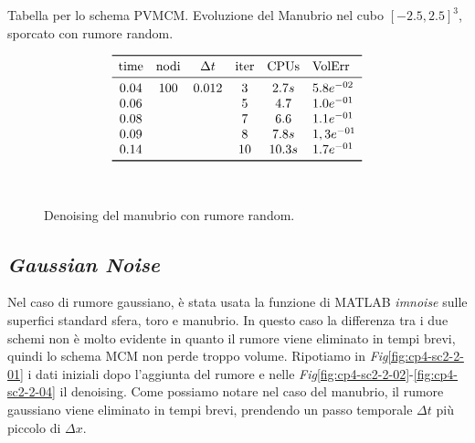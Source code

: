 \begin{table}[htb!]
\caption{Tabella per lo schema PVMCM. Evoluzione del Manubrio nel cubo
  $[-2.5,2.5]^3$, sporcato con rumore random.}
\label{tab:cp4-sc2-1-03}
\[
\begin{array}{*{5}{c}l}
    \toprule
    \text{time} &\text{nodi} &\Delta t &\text{iter} &\text{CPUs}&\text{VolErr} \\
    \midrule
     0.04       & 100        & 0.012   & 3          & 2.7s     &5.8e^{-02}\\
     0.06       &            &         & 5          & 4.7      &1.0e^{-01}\\ 
     0.08       &            &         & 7          & 6.6      &1.1e^{-01}\\ 
     0.09       &            &         & 8          & 7.8s     &1,3e^{-01}\\
     0.14       &            &         & 10         & 10.3s    &1.7e^{-01}\\     
     \bottomrule
\end{array}
\]
\end{table}

\begin{figure}[htb!]
  \centering
  \quad
  \\
  \quad
  \quad
  \caption{Denoising del manubrio con rumore random.}
  \label{fig:cp4-sc2-1-03}
\end{figure}

%
\subsection{\emph{Gaussian Noise}}
Nel caso di rumore gaussiano, è stata usata la funzione di MATLAB
\emph{imnoise} sulle superfici standard sfera, toro e manubrio. In
questo caso la differenza tra i due schemi non è molto evidente in
quanto il rumore viene eliminato in tempi brevi, quindi lo schema MCM
non perde troppo volume. Ripotiamo in \emph{Fig}\ref{fig:cp4-sc2-2-01}
i dati iniziali dopo l'aggiunta del rumore e nelle
\emph{Fig}\ref{fig:cp4-sc2-2-02}-\ref{fig:cp4-sc2-2-04} il
denoising. Come possiamo notare nel caso del manubrio, il rumore
gaussiano viene eliminato in tempi brevi, prendendo un  passo
temporale $\Delta t$ più piccolo di $\Delta x$.

